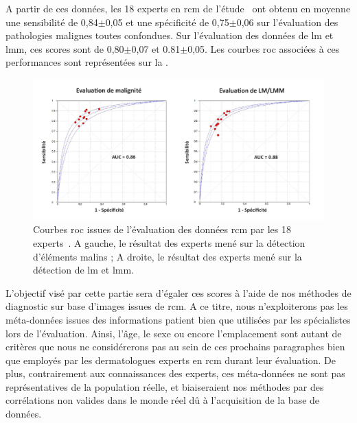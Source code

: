 A partir de ces données, les 18 experts en \gls{rcm} de l'étude~\cite{Cinotti2018} ont obtenu en moyenne une sensibilité de 0,84$\pm$0,05 et une spécificité de 0,75$\pm$0,06 sur l'évaluation des pathologies malignes toutes confondues. Sur l'évaluation des données de \gls{lm} et \gls{lmm}, ces scores sont de 0,80$\pm$0,07 et 0.81$\pm$0,05. Les courbes \gls{roc} associées à ces performances sont représentées sur la .\par

\begin{figure}[H]
    \begin{center}
        \includegraphics[width=\linewidth]{contents/ii_preamble_microscopy/resources/results_rcm_experts.pdf}
        \caption{Courbes \gls{roc} issues de l'évaluation des données \gls{rcm} par les 18 experts~\cite{Cinotti2018}. A gauche, le résultat des experts mené sur la détection d'éléments malins ; A droite, le résultat des experts mené sur la détection de \gls{lm} et \gls{lmm}.}
        \label{fig:results_rcm_experts}
    \end{center} 
\end{figure}\par

L'objectif visé par cette partie sera d'égaler ces scores à l'aide de nos méthodes de diagnostic sur base d'images issues de \gls{rcm}. A ce titre, nous n'exploiterons pas les méta-données issues des informations patient bien que utilisées par les spécialistes lors de l'évaluation. Ainsi, l'âge, le sexe ou encore l'emplacement sont autant de critères que nous ne considérerons pas au sein de ces prochains paragraphes bien que employés par les dermatologues experts en \gls{rcm} durant leur évaluation. De plus, contrairement aux connaissances des experts, ces méta-données ne sont pas représentatives de la population réelle, et biaiseraient nos méthodes par des corrélations non valides dans le monde réel dû à l'acquisition de la base de données.\par

